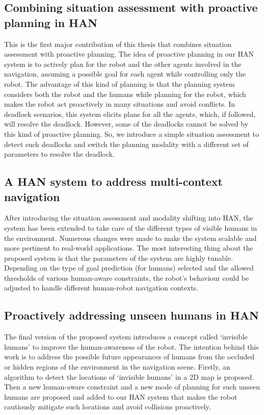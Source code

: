 \subsection*{Combining situation assessment with proactive planning in HAN}
This is the first major contribution of this thesis that combines situation assessment with proactive planning. The idea of proactive planning in our HAN system is to actively plan for the robot and the other agents involved in the navigation, assuming a possible goal for each agent while controlling only the robot. The advantage of this kind of planning is that the planning system considers both the robot and the humans while planning for the robot, which makes the robot act proactively in many situations and avoid conflicts. In deadlock scenarios, this system elicits plans for all the agents, which, if followed, will resolve the deadlock. However, some of the deadlocks cannot be solved by this kind of proactive planning. So, we introduce a simple situation assessment to detect such deadlocks and switch the planning modality with a different set of parameters to resolve the deadlock.  

\subsection*{A HAN system to address multi-context navigation}
After introducing the situation assessment and modality shifting into HAN, the system has been extended to take care of the different types of visible humans in the environment. Numerous changes were made to make the system scalable and more pertinent to real-world applications. The most interesting thing about the proposed system is that the parameters of the system are highly tunable. Depending on the type of goal prediction (for humans) selected and the allowed thresholds of various human-aware constraints, the robot's behaviour could be adjusted to handle different human-robot navigation contexts. 

\subsection*{Proactively addressing unseen humans in HAN}
The final version of the proposed system introduces a concept called `invisible humans' to improve the human-awareness of the robot. The intention behind this work is to address the possible future appearances of humans from the occluded or hidden regions of the environment in the navigation scene. Firstly, an algorithm to detect the locations of `invisible humans' in a 2D map is proposed. Then a new human-aware constraint and a new mode of planning for such unseen humans are proposed and added to our HAN system that makes the robot cautiously mitigate such locations and avoid collisions proactively.

